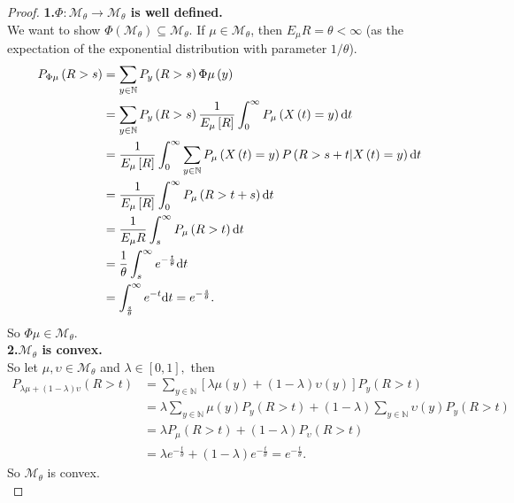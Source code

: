 \documentclass[12pt,a4paper]{scrartcl}
\numberwithin{equation}{section}
\newcommand{\N}{\mathbb{N}} %
\begin{document}
\begin{proof}
\textbf{1.$\Phi:\mathcal{M}_{\theta} \to \mathcal{M}_{\theta}$ is well defined.} \\

We want to show $\Phi\left(\mathcal{M}_{\theta}\right) \subseteq \mathcal{M}_{\theta}.$ If $ \mu \in \mathcal{M}_{\theta} $, then $ E_{\mu} R = \theta < \infty$ (as the expectation of the exponential distribution with parameter $1/\theta$).  
\begin{align*}
P_{\Phi\mu}\left(R>s\right) &= \sum_{y \in \N} P_y\left(R > s \right) \Phi\mu\left(y\right)  \\
&= \sum_{y \in \N} P_y\left(R > s \right) \frac{1}{E_{\mu}\left[R\right]} \int_0^\infty P_{\mu}\left(X\left(t\right) = y\right) \textnormal{d}t \\
&= \frac{1}{E_{\mu}\left[R\right]} \int_0^\infty \sum_{y \in \N} P_{\mu}\left(X\left(t\right) = y\right) P\left(R > s + t | X\left(t\right) = y \right) \textnormal{d}t \\
&= \frac{1}{E_{\mu}\left[R\right]} \int_0^\infty P_{\mu}\left(R > t+s\right) \textnormal{d}t \\
&= \frac{1}{E_{\mu} R} \int_s^{\infty} P_{\mu}\left(R > t\right) \textnormal{d}t \\
&= \frac{1}{\theta} \int_s^{\infty} e^{-\frac{t}{\theta}} \textnormal{d}t \\
&= \int_{\frac{s}{\theta}}^{\infty} e^{-t} \textnormal{d}t = e^{-\frac{s}{\theta}}.
\end{align*}
So $\Phi\mu \in \mathcal{M}_{\theta}.$ \\[2ex]

\textbf{2.$\mathcal{M}_{\theta}$ is convex.}\\
So let $\mu, \upsilon \in \mathcal{M}_{\theta}$ and $\lambda \in \left[0,1\right],$ then
\begin{align*}
P_{\lambda \mu +\left(1-\lambda\right)\upsilon}\left(R > t\right) &= \sum_{y \in \N} \left[\lambda \mu\left(y\right) + \left(1-\lambda\right) \upsilon\left(y\right) \right] P_y\left(R > t\right) \\
&=\lambda \sum_{y \in \N} \mu\left(y\right) P_y\left(R > t\right) + \left(1- \lambda\right) \sum_{y \in \N} \upsilon\left(y\right) P_y\left(R > t\right) \\
&= \lambda P_{\mu}\left(R > t\right) + \left(1-\lambda\right) P_{\upsilon}\left(R > t\right) \\
&=\lambda e^{-\frac{t}{\theta}} + \left(1-\lambda\right) e^{-\frac{t}{\theta}} = e^{-\frac{t}{\theta}}.
\end{align*}
So $\mathcal{M}_{\theta}$ is convex. \\[2ex]



\end{proof}
\end{document}
